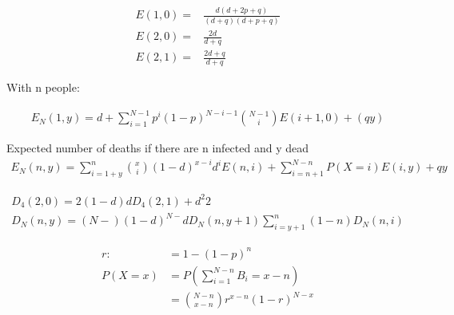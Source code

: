 \documentclass[12pt]{report}
\numberwithin{equation}{section}
\begin{document}
\begin{align*}
E(1,0) = & \frac{d(d+2p+q)}{(d+q)(d+p+q)} \\
E(2,0) = & \frac{2d}{d+q} \\
E(2,1) = & \frac{2d+q}{d+q} 
\end{align*}

With n people: 

\begin{align*}
E_N(1,y) = d + \sum_{i=1}^{N-1}p^i(1-p)^{N-i-1}\binom{N-1}{i}E(i+1,0) + (q y)
\end{align*}

Expected number of deaths if there are n infected and y dead
\begin{align*}
E_N(n,y) = \sum_{i = 1+y}^n \binom{x}{i}(1-d)^{x-i}d^i E(n,i) + \sum_{i=n+1}^{N-n} P(X=i)E(i,y) + q y
\end{align*}

\begin{align*}
D_4(2,0) =  2(1-d)d D_4(2,1) + d^2 2  \\
D_N(n,y) = (N-)(1-d)^{N-} d D_N(n,y+1)
\sum_{i=y+1}^n (1-n) D_N(n,i)
\end{align*}


\begin{align*}
r: &=1-(1-p)^n \\
P(X=x)&=P\left(\sum_{i=1}^{N-n}B_i=x-n\right) \\
&=\binom{N-n}{x-n}r^{x-n}(1-r)^{N-x}
\end{align*}





\end{document}
